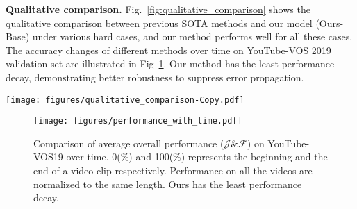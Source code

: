 \documentclass[sigconf]{acmart}
\begin{document}
\noindent\textbf{Qualitative comparison.}
Fig.~\ref{fig:qualitative_comparison} shows the qualitative comparison between previous SOTA methods and our model (Ours-Base) under various hard cases, and our method performs well for all these cases.
The accuracy changes of different methods over time on YouTube-VOS 2019 validation set are illustrated in Fig~\ref{fig:YTB_decay}. Our method has the least performance decay, demonstrating better robustness to suppress error propagation.


\begin{figure*}[t!]
	\centering
	\texttt{[image: figures/qualitative\_comparison-Copy.pdf]}
\caption{Qualitative comparison to competitive methods, JOINT and CFBI on YouTube-VOS 19 validation set. With the proposed adaptive proxy representation and object mask calibration for mask decoding, our model can tackle cases such as (a) object occlusion, (b) large camera rotation, and (c) fast motion better. Error regions are highlighted with blue bounding boxes.}
	\label{fig:qualitative_comparison}
\end{figure*} \begin{figure}[t]
\centering
\texttt{[image: figures/performance\_with\_time.pdf]}\caption{Comparison of average overall performance ($\mathcal{J}\&\mathcal{F}$) on YouTube-VOS19 over time. 0(\%) and 100(\%) represents the beginning and the end of a video clip respectively. Performance on all the videos are normalized to the same length. Ours has the least performance decay.} \label{fig:YTB_decay}                   
\end{figure}
 
\end{document}
